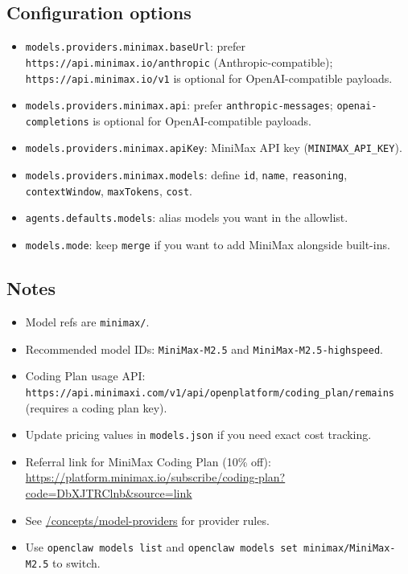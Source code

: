 \subsection{Configuration options}


\begin{itemize}
  \item \texttt{models.providers.minimax.baseUrl}: prefer \texttt{https://api.minimax.io/anthropic} (Anthropic-compatible); \texttt{https://api.minimax.io/v1} is optional for OpenAI-compatible payloads.
  \item \texttt{models.providers.minimax.api}: prefer \texttt{anthropic-messages}; \texttt{openai-completions} is optional for OpenAI-compatible payloads.
  \item \texttt{models.providers.minimax.apiKey}: MiniMax API key (\texttt{MINIMAX\_API\_KEY}).
  \item \texttt{models.providers.minimax.models}: define \texttt{id}, \texttt{name}, \texttt{reasoning}, \texttt{contextWindow}, \texttt{maxTokens}, \texttt{cost}.
  \item \texttt{agents.defaults.models}: alias models you want in the allowlist.
  \item \texttt{models.mode}: keep \texttt{merge} if you want to add MiniMax alongside built-ins.
\end{itemize}


\subsection{Notes}


\begin{itemize}
  \item Model refs are \texttt{minimax/}.
  \item Recommended model IDs: \texttt{MiniMax-M2.5} and \texttt{MiniMax-M2.5-highspeed}.
  \item Coding Plan usage API: \texttt{https://api.minimaxi.com/v1/api/openplatform/coding\_plan/remains} (requires a coding plan key).
  \item Update pricing values in \texttt{models.json} if you need exact cost tracking.
  \item Referral link for MiniMax Coding Plan (10\% off): \href{https://platform.minimax.io/subscribe/coding-plan?code=DbXJTRClnb\&source=link}{https://platform.minimax.io/subscribe/coding-plan?code=DbXJTRClnb\&source=link}
  \item See \href{/concepts/model-providers}{/concepts/model-providers} for provider rules.
  \item Use \texttt{openclaw models list} and \texttt{openclaw models set minimax/MiniMax-M2.5} to switch.
\end{itemize}


